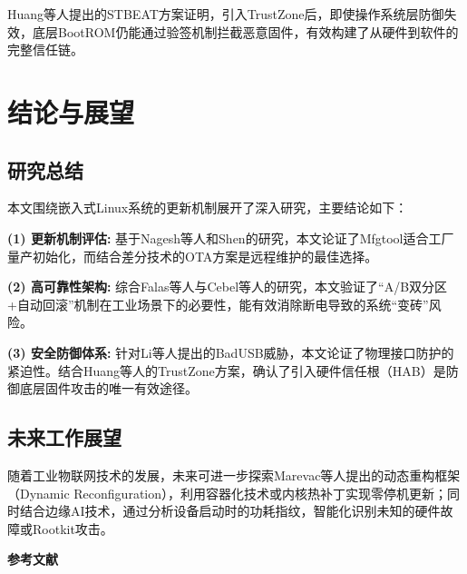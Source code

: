\documentclass[a4paper,12pt]{article}
\begin{document}
Huang等人提出的STBEAT方案证明，引入TrustZone后，即使操作系统层防御失效，底层BootROM仍能通过验签机制拦截恶意固件，有效构建了从硬件到软件的完整信任链\cite{Huang2022}。

\newpage
\section{结论与展望}

\subsection{研究总结}
本文围绕嵌入式Linux系统的更新机制展开了深入研究，主要结论如下：

\textbf{(1) 更新机制评估:} 
基于Nagesh等人和Shen的研究\cite{Nagesh2019, Shen2007}，本文论证了Mfgtool适合工厂量产初始化，而结合差分技术的OTA方案是远程维护的最佳选择。

\textbf{(2) 高可靠性架构:} 
综合Falas等人与Cebel等人的研究\cite{Falas2019, Cebel2022}，本文验证了“A/B双分区+自动回滚”机制在工业场景下的必要性，能有效消除断电导致的系统“变砖”风险。

\textbf{(3) 安全防御体系:} 
针对Li等人提出的BadUSB威胁\cite{Li2025}，本文论证了物理接口防护的紧迫性。结合Huang等人的TrustZone方案\cite{Huang2022}，确认了引入硬件信任根（HAB）是防御底层固件攻击的唯一有效途径。

\subsection{未来工作展望}
随着工业物联网技术的发展，未来可进一步探索Marevac等人提出的动态重构框架（Dynamic Reconfiguration），利用容器化技术或内核热补丁实现零停机更新\cite{Marevac2025}；同时结合边缘AI技术，通过分析设备启动时的功耗指纹，智能化识别未知的硬件故障或Rootkit攻击。

\newpage
\begin{center}
    \songti\bfseries 参考文献
\end{center}
\vspace{0.5em}
\end{document}
